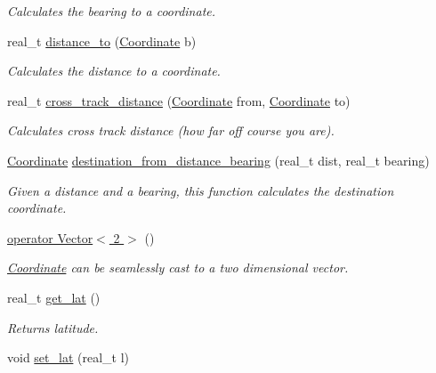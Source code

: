 \begin{DoxyCompactItemize}
\begin{DoxyCompactList}\small\item\em Calculates the bearing to a coordinate. \end{DoxyCompactList}\item 
real\-\_\-t \hyperlink{classetk_1_1_coordinate_aab7ff3621f3db25502ce2de8ae7939a3}{distance\-\_\-to} (\hyperlink{classetk_1_1_coordinate}{Coordinate} b)
\begin{DoxyCompactList}\small\item\em Calculates the distance to a coordinate. \end{DoxyCompactList}\item 
real\-\_\-t \hyperlink{classetk_1_1_coordinate_a9b4cd72b2c6da705ad512bb3b0d8d87a}{cross\-\_\-track\-\_\-distance} (\hyperlink{classetk_1_1_coordinate}{Coordinate} from, \hyperlink{classetk_1_1_coordinate}{Coordinate} to)
\begin{DoxyCompactList}\small\item\em Calculates cross track distance (how far off course you are). \end{DoxyCompactList}\item 
\hyperlink{classetk_1_1_coordinate}{Coordinate} \hyperlink{classetk_1_1_coordinate_a6fa7af357fa8256c3e280557cbe440ae}{destination\-\_\-from\-\_\-distance\-\_\-bearing} (real\-\_\-t dist, real\-\_\-t bearing)
\begin{DoxyCompactList}\small\item\em Given a distance and a bearing, this function calculates the destination coordinate. \end{DoxyCompactList}\item 
\hyperlink{classetk_1_1_coordinate_af0e3972f8bf38253cf2b40c79ac51300}{operator Vector$<$ 2 $>$} ()
\begin{DoxyCompactList}\small\item\em \hyperlink{classetk_1_1_coordinate}{Coordinate} can be seamlessly cast to a two dimensional vector. \end{DoxyCompactList}\item 
\hypertarget{classetk_1_1_coordinate_a5a42cf3900fb33cd937d38ed5d311cdc}{real\-\_\-t \hyperlink{classetk_1_1_coordinate_a5a42cf3900fb33cd937d38ed5d311cdc}{get\-\_\-lat} ()}\label{classetk_1_1_coordinate_a5a42cf3900fb33cd937d38ed5d311cdc}

\begin{DoxyCompactList}\small\item\em Returns latitude. \end{DoxyCompactList}\item 
\hypertarget{classetk_1_1_coordinate_a69e4918c11dcc467bc32533d0f5dc947}{void \hyperlink{classetk_1_1_coordinate_a69e4918c11dcc467bc32533d0f5dc947}{set\-\_\-lat} (real\-\_\-t l)}\label{classetk_1_1_coordinate_a69e4918c11dcc467bc32533d0f5dc947}


\end{DoxyCompactItemize}
